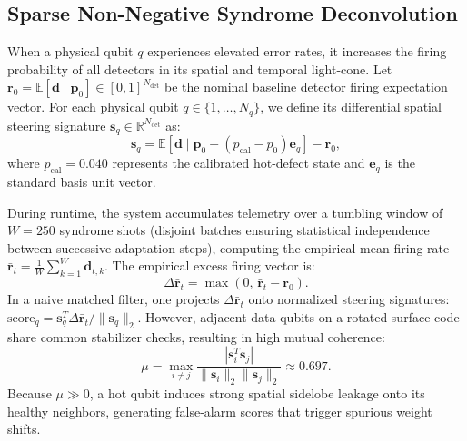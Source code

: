 \documentclass[aps,prxquantum,reprint,superscriptaddress,floatfix,nofootinbib]{revtex4-2}
\begin{document}
\subsection{Sparse Non-Negative Syndrome Deconvolution}
\label{subsec:nnls}
When a physical qubit $q$ experiences elevated error rates, it increases the firing probability of all detectors in its spatial and temporal light-cone. Let $\mathbf{r}_0 = \mathbb{E}[\mathbf{d} \mid \mathbf{p}_0] \in [0, 1]^{N_{\text{det}}}$ be the nominal baseline detector firing expectation vector. For each physical qubit $q \in \{1, \dots, N_q\}$, we define its differential spatial steering signature $\mathbf{s}_q \in \mathbb{R}^{N_{\text{det}}}$ as:
\begin{equation}
    \mathbf{s}_q = \mathbb{E}\left[\mathbf{d} \mid \mathbf{p}_0 + (p_{\text{cal}} - p_0)\mathbf{e}_q\right] - \mathbf{r}_0,
    \label{eq:steering_sig}
\end{equation}
where $p_{\text{cal}} = 0.040$ represents the calibrated hot-defect state and $\mathbf{e}_q$ is the standard basis unit vector.

During runtime, the system accumulates telemetry over a tumbling window of $W = 250$ syndrome shots (disjoint batches ensuring statistical independence between successive adaptation steps), computing the empirical mean firing rate $\bar{\mathbf{r}}_t = \frac{1}{W} \sum_{k=1}^W \mathbf{d}_{t, k}$. The empirical excess firing vector is:
\begin{equation}
    \Delta \bar{\mathbf{r}}_t = \max(0, \, \bar{\mathbf{r}}_t - \mathbf{r}_0).
\end{equation}
In a naive matched filter, one projects $\Delta \bar{\mathbf{r}}_t$ onto normalized steering signatures: $\text{score}_q = \mathbf{s}_q^T \Delta \bar{\mathbf{r}}_t / \|\mathbf{s}_q\|_2$. However, adjacent data qubits on a rotated surface code share common stabilizer checks, resulting in high mutual coherence:
\begin{equation}
    \mu = \max_{i \ne j} \frac{|\mathbf{s}_i^T \mathbf{s}_j|}{\|\mathbf{s}_i\|_2 \|\mathbf{s}_j\|_2} \approx 0.697.
\end{equation}
Because $\mu \gg 0$, a hot qubit induces strong spatial sidelobe leakage onto its healthy neighbors, generating false-alarm scores that trigger spurious weight shifts.
\end{document}
